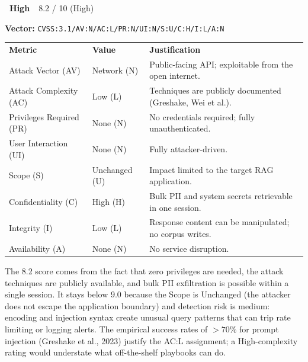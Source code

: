 \documentclass[a4paper,12pt]{report}
\newcommand{\badgehigh}{%
  \colorbox{warn}{\color{white}\small\textbf{~High~}}}
\newcommand{\cvssvec}[1]{\texttt{\small #1}}
\begin{document}
\begin{cvssbox}{\badgehigh\ 8.2 / 10 (High)}
\vspace{2pt}
\begin{center}
\textbf{Vector:}\enspace
\cvssvec{CVSS:3.1/AV:N/AC:L/PR:N/UI:N/S:U/C:H/I:L/A:N}
\end{center}
\vspace{8pt}
\begin{tabular}{L{3.4cm} L{2.2cm} L{7.8cm}}
  \color{white}\small\textbf{Metric} &
  \color{white}\small\textbf{Value} &
  \color{white}\small\textbf{Justification} \\
  \small Attack Vector (AV)     & \small Network (N) & \small Public-facing API; exploitable from the open internet. \\
  \small Attack Complexity (AC) & \small Low (L)     & \small Techniques are publicly documented (Greshake, Wei et al.). \\
  \small Privileges Required (PR)  & \small None (N) & \small No credentials required; fully unauthenticated. \\
  \small User Interaction (UI)  & \small None (N)    & \small Fully attacker-driven. \\
  \small Scope (S)              & \small Unchanged (U) & \small Impact limited to the target RAG application. \\
  \small Confidentiality (C)    & \small High (H)    & \small Bulk PII and system secrets retrievable in one session. \\
  \small Integrity (I)          & \small Low (L)     & \small Response content can be manipulated; no corpus writes. \\
  \small Availability (A)       & \small None (N)    & \small No service disruption. \\
\end{tabular}
\vspace{6pt}

\small The 8.2 score comes from the fact that zero privileges are needed,
the attack techniques are publicly available, and bulk PII exfiltration is
possible within a single session. It stays below 9.0 because the Scope is
Unchanged (the attacker does not escape the application boundary) and
detection risk is medium: encoding and injection syntax create unusual
query patterns that can trip rate limiting or logging alerts. The empirical
success rates of $>70\%$ for prompt injection (Greshake et al., 2023)
justify the AC:L assignment; a High-complexity rating would understate
what off-the-shelf playbooks can do.
\end{cvssbox}
\end{document}

